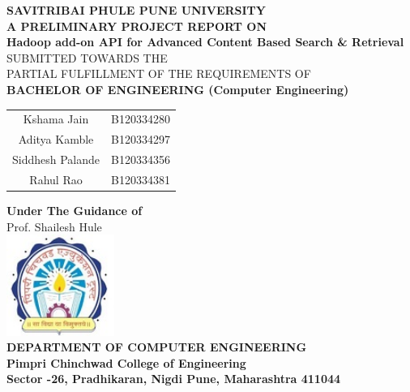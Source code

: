 \documentclass[oneside,a4paper,12pt]{report}
\begin{document}
\setlength{\parindent}{0mm}
\begin{center}
{\bfseries SAVITRIBAI PHULE PUNE UNIVERSITY \\}
 \vspace*{1\baselineskip}
{\bfseries A PRELIMINARY PROJECT REPORT ON \\}
 \vspace*{2\baselineskip}
{\bfseries \fontsize{16}{12} \selectfont Hadoop add-on API for Advanced Content Based Search \& Retrieval \\ \vspace*{2\baselineskip}}
{\fontsize{12}{12} \selectfont SUBMITTED TOWARDS THE
 \\PARTIAL FULFILLMENT OF THE REQUIREMENTS OF \\

\vspace*{2\baselineskip}}
{\bfseries \fontsize{14}{12} \selectfont BACHELOR OF ENGINEERING (Computer
Engineering) \\
\vspace*{1\baselineskip}} 

\begin{tabular}{cc}
Kshama Jain  & B120334280 \\
Aditya Kamble  & B120334297 \\
Siddhesh Palande  & B120334356 \\
Rahul Rao  & B120334381 \\[4ex]
\end{tabular}


\textbf{Under The Guidance of} \\[4ex]
Prof. Shailesh Hule \\[4ex]

\includegraphics[width=100pt]{image_pccoelogo.jpg} \\
{\bfseries \fontsize{14}{12} \selectfont DEPARTMENT OF COMPUTER ENGINEERING \\
Pimpri Chinchwad College of Engineering \\
Sector -26, Pradhikaran, Nigdi Pune, Maharashtra 411044
}
\end{center}
\end{document}
